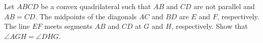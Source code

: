 Let $ ABCD$ be a convex quadrilateral such that $ AB$ and $ CD$ are not parallel and $ AB=CD$. The midpoints of the diagonals $ AC$ and $ BD$ are $ E$ and $ F$,  respectively. The line $ EF$ meets segments $ AB$ and $ CD$ at $ G$ and $ H$,  respectively. Show that $ \angle AGH = \angle DHG$.